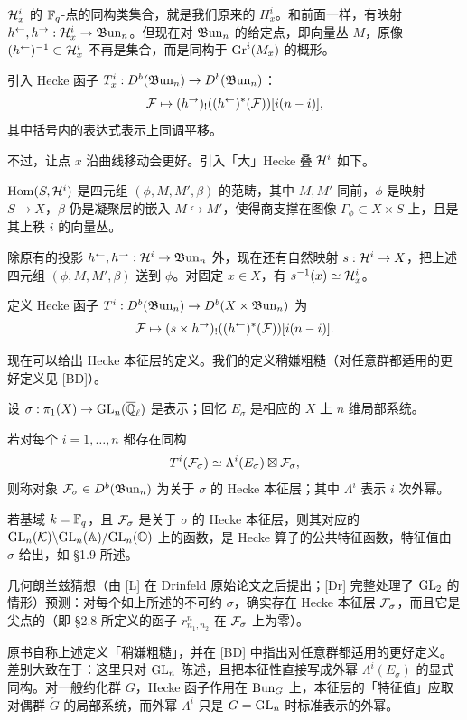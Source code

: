 $\mathcal{H}_x^i$ 的 $\mathbb{F}_q$-点的同构类集合，就是我们原来的 $H_x^i$。和前面一样，有映射 $h^{\leftarrow},h^{\rightarrow}:\mathcal{H}_x^i\to\mathfrak{B}\mathrm{un}_n$。但现在对 $\mathfrak{B}\mathrm{un}_n$ 的给定点，即向量丛 $M$，原像 $(h^{\leftarrow})^{-1}\subset\mathcal{H}_x^i$ 不再是集合，而是同构于 $\operatorname{Gr}^i(M_x)$ 的概形。

引入 Hecke 函子 $T_x^i:D^b(\mathfrak{B}\mathrm{un}_n)\to D^b(\mathfrak{B}\mathrm{un}_n)$：
\[
\mathcal{F}\mapsto(h^{\rightarrow})_!((h^{\leftarrow})^*(\mathcal{F}))[i(n-i)],
\]
其中括号内的表达式表示上同调平移。

不过，让点 $x$ 沿曲线移动会更好。引入「大」Hecke 叠 $\mathcal{H}^i$ 如下。

$\operatorname{Hom}(S,\mathcal{H}^i)$ 是四元组 $(\phi,M,M',\beta)$ 的范畴，其中 $M,M'$ 同前，$\phi$ 是映射 $S\to X$，$\beta$ 仍是凝聚层的嵌入 $M\hookrightarrow M'$，使得商支撑在图像 $\Gamma_\phi\subset X\times S$ 上，且是其上秩 $i$ 的向量丛。

除原有的投影 $h^{\leftarrow},h^{\rightarrow}:\mathcal{H}^i\to\mathfrak{B}\mathrm{un}_n$ 外，现在还有自然映射 $s:\mathcal{H}^i\to X$，把上述四元组 $(\phi,M,M',\beta)$ 送到 $\phi$。对固定 $x\in X$，有 $s^{-1}(x)\simeq\mathcal{H}_x^i$。

定义 Hecke 函子 $T^i:D^b(\mathfrak{B}\mathrm{un}_n)\to D^b(X\times\mathfrak{B}\mathrm{un}_n)$ 为
\[
\mathcal{F}\mapsto(s\times h^{\rightarrow})_!((h^{\leftarrow})^*(\mathcal{F}))[i(n-i)].
\]

现在可以给出 Hecke 本征层的定义。我们的定义稍嫌粗糙（对任意群都适用的更好定义见 [BD]）。

设 $\sigma:\pi_1(X)\to\mathrm{GL}_n(\overline{\mathbb{Q}}_\ell)$ 是表示；回忆 $E_\sigma$ 是相应的 $X$ 上 $n$ 维局部系统。

若对每个 $i=1,\dots,n$ 都存在同构
\[
T^i(\mathcal{F}_\sigma)\simeq\Lambda^i(E_\sigma)\boxtimes\mathcal{F}_\sigma,
\]
则称对象 $\mathcal{F}_\sigma\in D^b(\mathfrak{B}\mathrm{un}_n)$ 为关于 $\sigma$ 的 Hecke 本征层；其中 $\Lambda^i$ 表示 $i$ 次外幂。

若基域 $k=\mathbb{F}_q$，且 $\mathcal{F}_\sigma$ 是关于 $\sigma$ 的 Hecke 本征层，则其对应的 $\mathrm{GL}_n(\mathcal{K})\backslash\mathrm{GL}_n(\mathbb{A})/\mathrm{GL}_n(\mathbb{O})$ 上的函数，是 Hecke 算子的公共特征函数，特征值由 $\sigma$ 给出，如 \S1.9 所述。

几何朗兰兹猜想（由 [L] 在 Drinfeld 原始论文之后提出；[Dr] 完整处理了 $\mathrm{GL}_2$ 的情形）预测：对每个如上所述的不可约 $\sigma$，确实存在 Hecke 本征层 $\mathcal{F}_\sigma$，而且它是尖点的（即 \S2.8 所定义的函子 $r^n_{n_1,n_2}$ 在 $\mathcal{F}_\sigma$ 上为零）。

\begin{annote}
原书自称上述定义「稍嫌粗糙」，并在 [BD] 中指出对任意群都适用的更好定义。差别大致在于：这里只对 $\mathrm{GL}_n$ 陈述，且把本征性直接写成外幂 $\Lambda^i(E_\sigma)$ 的显式同构。对一般约化群 $G$，Hecke 函子作用在 $\operatorname{Bun}_G$ 上，本征层的「特征值」应取对偶群 $\check{G}$ 的局部系统，而外幂 $\Lambda^i$ 只是 $G=\mathrm{GL}_n$ 时标准表示的外幂。\par\vspace{0.15em}{\raggedleft 【来源：原书 \S3.4 与 [BD]（A）】\par}
\end{annote}

